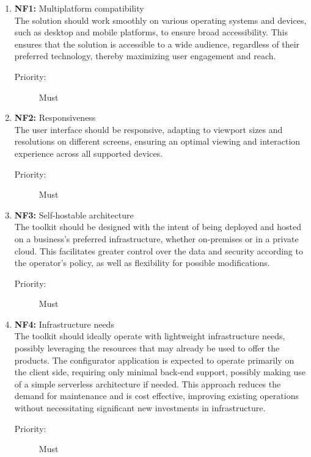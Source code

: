 \begin{enumerate}

\item \textbf{NF1:} \label{itm:NF1} Multiplatform compatibility
\vspace{2pt}
\\The solution should work smoothly on various operating systems and devices, such as desktop and mobile platforms, to ensure broad accessibility. This ensures that the solution is accessible to a wide audience, regardless of their preferred technology, thereby maximizing user engagement and reach.
\begin{description}
    \item[Priority:] Must
\end{description}
\vspace{4pt}

\item \textbf{NF2:} \label{itm:NF2} Responsiveness
\vspace{2pt}
\\The user interface should be responsive, adapting to viewport sizes and resolutions on different screens, ensuring an optimal viewing and interaction experience across all supported devices.
\begin{description}
    \item[Priority:] Must
\end{description}
\vspace{4pt}

\item \textbf{NF3:} \label{itm:NF3} Self-hostable architecture
\vspace{2pt}
\\The toolkit should be designed with the intent of being deployed and hosted on a business's preferred infrastructure, whether on-premises or in a private cloud. This facilitates greater control over the data and security according to the operator's policy, as well as flexibility for possible modifications.
\begin{description}
    \item[Priority:] Must
\end{description}
\vspace{4pt}

\item \textbf{NF4:} \label{itm:NF4} Infrastructure needs
\vspace{2pt}
\\The toolkit should ideally operate with lightweight infrastructure needs, possibly leveraging the resources that may already be used to offer the products. The configurator application is expected to operate primarily on the client side, requiring only minimal back-end support, possibly making use of a simple serverless architecture if needed. This approach reduces the demand for maintenance and is cost effective, improving existing operations without necessitating significant new investments in infrastructure.
\begin{description}
    \item[Priority:] Must
\end{description}
\vspace{4pt}


\end{enumerate}
